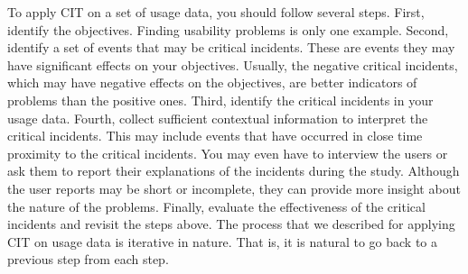 To apply CIT on a set of usage data, you should follow several steps. First,
identify the objectives. Finding usability problems is only one example.
Second, identify a set of events that may be critical incidents. These are
events they may have significant effects on your objectives. Usually, the
negative critical incidents, which may have negative effects on the objectives,
are better indicators of problems than the positive ones. Third, identify the
critical incidents in your usage data. Fourth, collect sufficient contextual
information to interpret the critical incidents. This may include events that
have occurred in close time proximity to the critical incidents. You may even
have to interview the users or ask them to report their explanations of the
incidents during the study. Although the user reports may be short or
incomplete, they can provide more insight about the nature of the problems.
Finally, evaluate the effectiveness of the critical incidents and revisit the
steps above. The process that we described for applying CIT on usage data is
iterative in nature. That is, it is natural to go back to a previous step from
each step.

